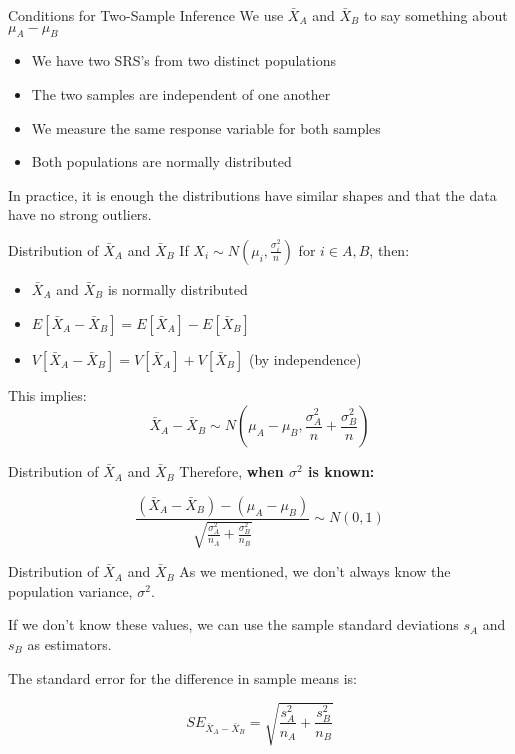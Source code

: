 \documentclass{beamer}
\begin{document}
\begin{frame}{Conditions for Two-Sample Inference}
	We use $\bar{X}_A$ and $\bar{X}_B$ to say something about $\mu_A - \mu_B$
	
	\begin{itemize}
		\item We have two SRS's from two distinct populations
		\item The two samples are independent of one another
		\item We measure the same response variable for both samples
		\item Both populations are normally distributed
	\end{itemize}
	
	In practice, it is enough the distributions have similar shapes and that the data have no strong outliers.
\end{frame}

\begin{frame}{Distribution of $\bar{X}_A$ and $\bar{X}_B$}
	If $X_i \sim N\left(\mu_i, \frac{\sigma^2_i}{n}\right)$ for $i \in A, B$, then:
	
	\begin{itemize}
		\item $\bar{X}_A$ and $\bar{X}_B$ is normally distributed
		      
		\item $E[\bar{X}_A - \bar{X}_B] = E[\bar{X}_A] - E[\bar{X}_B]$
		      
		\item $V[\bar{X}_A - \bar{X}_B] = V[\bar{X}_A] + V[\bar{X}_B]$ (by independence)
	\end{itemize}
	
	This implies:
	\[ 
		\bar{X}_A - \bar{X}_B \sim N(\mu_A-\mu_B, \frac{\sigma^2_A}{n} + \frac{\sigma^2_B}{n})
	\]
\end{frame}

\begin{frame}{Distribution of $\bar{X}_A$ and $\bar{X}_B$}
	Therefore, \textbf{when $\sigma^2$ is known:}
	
	\[
		\frac{(\bar{X}_A-\bar{X}_B) - (\mu_A-\mu_B)}{\sqrt{\frac{\sigma^2_A}{n_A} + \frac{\sigma^2_B}{n_B}}} \sim N(0,1)
	\]
\end{frame}


\begin{frame}{Distribution of $\bar{X}_A$ and $\bar{X}_B$}
	As we mentioned, we don't always know the population variance, $\sigma^2$. 
	
	If we don't know these values, we can use the sample standard deviations $s_A$ and $s_B$ as estimators. 
	
	The standard error for the difference in sample means is:

	\[
		SE_{\bar{X}_A-\bar{X}_B}=\sqrt{\frac{s^2_A}{n_A}+\frac{s^2_B}{n_B}}
	\]
\end{frame}
\end{document}
